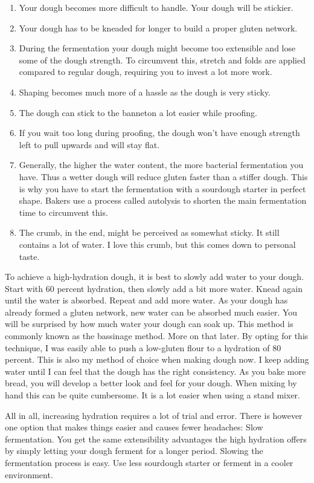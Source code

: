 \begin{enumerate}
  \item Your dough becomes more difficult to handle. Your dough will be stickier.
  \item Your dough has to be kneaded for longer to build a proper gluten
    network.
  \item During the fermentation your dough might become too extensible and lose
    some of the dough strength. To circumvent this, stretch and folds are applied
    compared to regular dough,
    requiring you to invest a lot more work.
  \item Shaping becomes much more of a hassle as the dough is very sticky.
  \item The dough can stick to the banneton a lot easier while proofing.
  \item If you wait too long during proofing, the dough won't have enough strength
    left to pull upwards and will stay flat.
  \item Generally, the higher the water content, the more bacterial fermentation you
    have. Thus a wetter dough will reduce gluten faster than a stiffer dough.
    This is why you have to start the fermentation with a sourdough starter in
    perfect shape. Bakers use a process called autolysis to shorten the main
    fermentation time to circumvent this.
  \item The crumb, in the end, might be perceived as somewhat sticky. It still
    contains a lot of water. I love this crumb, but this comes down to personal
    taste.
\end{enumerate}

To achieve a high-hydration dough, it is best to slowly add water to
your dough. Start with 60 percent hydration, then slowly add a bit more water. Knead
again until the water is absorbed. Repeat and add more water. As your dough
has already formed a gluten network, new water can be absorbed much easier.
You will be surprised by how much water your dough can soak up. This
method is commonly known as the bassinage method. More on that later.
By opting for this technique, I was easily able to push a low-gluten flour
to a hydration of 80 percent. This
is also my method of choice when making dough now. I keep adding water until
I can feel that the dough has the right consistency. As you bake more bread,
you will develop a better look and feel for your dough. When mixing
by hand this can be quite cumbersome. It is a lot easier when using a stand
mixer.

All in all, increasing hydration requires a lot of trial and error. There
is however one option that makes things easier and causes fewer headaches:
Slow fermentation. You get the same extensibility advantages the high hydration
offers by simply letting your dough ferment for a longer period.
Slowing the fermentation process is easy. Use less
sourdough starter or ferment in a cooler environment.

